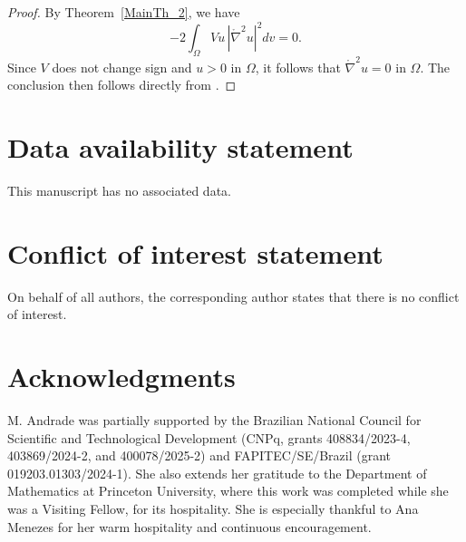 \documentclass[reqno,11pt]{amsart}
\numberwithin{equation}{section}  %
\begin{document}
\begin{proof}
By Theorem~\ref{MainTh_2}, we have
\[
-2\int_{\Omega}Vu\,|\mathring{\nabla}^{2}u|^{2}dv=0.
\]
Since \(V\) does not change sign and \(u>0\) in \(\Omega\), it follows that $\mathring{\nabla}^{2}u=0$ in $\Omega$. The conclusion then follows directly from \cite[Lemma 6]{farina2022}.
\end{proof}











\section*{Data availability statement}
This manuscript has no associated data.

\section*{Conflict of interest statement}
On behalf of all authors, the corresponding author states that there is no conflict of interest.

\section*{Acknowledgments}
M. Andrade was partially supported by the Brazilian National Council for Scientific and Technological Development (CNPq, grants 408834/2023-4, 403869/2024-2, and 400078/2025-2) and FAPITEC/SE/Brazil (grant 019203.01303/2024-1). She also extends her gratitude to the Department of Mathematics at Princeton University, where this work was completed while she was a Visiting Fellow, for its hospitality. She is especially thankful to Ana Menezes for her warm hospitality and continuous encouragement.
\end{document}
